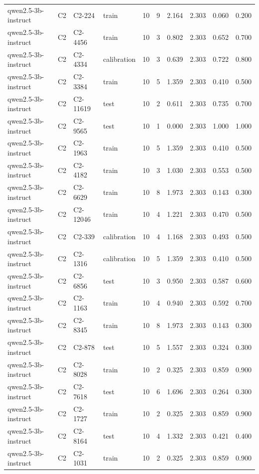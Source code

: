 \begin{table}
\begin{tabular}{llllrrrrrr}
qwen2.5-3b-instruct & C2 & C2-224 & train & 10 & 9 & 2.164 & 2.303 & 0.060 & 0.200 \\
qwen2.5-3b-instruct & C2 & C2-4456 & train & 10 & 3 & 0.802 & 2.303 & 0.652 & 0.700 \\
qwen2.5-3b-instruct & C2 & C2-4334 & calibration & 10 & 3 & 0.639 & 2.303 & 0.722 & 0.800 \\
qwen2.5-3b-instruct & C2 & C2-3384 & train & 10 & 5 & 1.359 & 2.303 & 0.410 & 0.500 \\
qwen2.5-3b-instruct & C2 & C2-11619 & test & 10 & 2 & 0.611 & 2.303 & 0.735 & 0.700 \\
qwen2.5-3b-instruct & C2 & C2-9565 & test & 10 & 1 & 0.000 & 2.303 & 1.000 & 1.000 \\
qwen2.5-3b-instruct & C2 & C2-1963 & train & 10 & 5 & 1.359 & 2.303 & 0.410 & 0.500 \\
qwen2.5-3b-instruct & C2 & C2-4182 & train & 10 & 3 & 1.030 & 2.303 & 0.553 & 0.500 \\
qwen2.5-3b-instruct & C2 & C2-6629 & train & 10 & 8 & 1.973 & 2.303 & 0.143 & 0.300 \\
qwen2.5-3b-instruct & C2 & C2-12046 & train & 10 & 4 & 1.221 & 2.303 & 0.470 & 0.500 \\
qwen2.5-3b-instruct & C2 & C2-339 & calibration & 10 & 4 & 1.168 & 2.303 & 0.493 & 0.500 \\
qwen2.5-3b-instruct & C2 & C2-1316 & calibration & 10 & 5 & 1.359 & 2.303 & 0.410 & 0.500 \\
qwen2.5-3b-instruct & C2 & C2-6856 & test & 10 & 3 & 0.950 & 2.303 & 0.587 & 0.600 \\
qwen2.5-3b-instruct & C2 & C2-1163 & train & 10 & 4 & 0.940 & 2.303 & 0.592 & 0.700 \\
qwen2.5-3b-instruct & C2 & C2-8345 & train & 10 & 8 & 1.973 & 2.303 & 0.143 & 0.300 \\
qwen2.5-3b-instruct & C2 & C2-878 & test & 10 & 5 & 1.557 & 2.303 & 0.324 & 0.300 \\
qwen2.5-3b-instruct & C2 & C2-8028 & train & 10 & 2 & 0.325 & 2.303 & 0.859 & 0.900 \\
qwen2.5-3b-instruct & C2 & C2-7618 & test & 10 & 6 & 1.696 & 2.303 & 0.264 & 0.300 \\
qwen2.5-3b-instruct & C2 & C2-1727 & train & 10 & 2 & 0.325 & 2.303 & 0.859 & 0.900 \\
qwen2.5-3b-instruct & C2 & C2-8164 & test & 10 & 4 & 1.332 & 2.303 & 0.421 & 0.400 \\
qwen2.5-3b-instruct & C2 & C2-1031 & train & 10 & 2 & 0.325 & 2.303 & 0.859 & 0.900 \\

\end{tabular}
\end{table}
